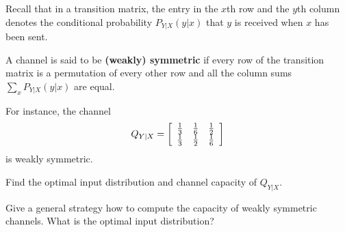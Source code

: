 \documentclass[a4paper,10pt,landscape,twocolumn]{scrartcl}
\begin{document}
%

\begin{exercise}
Recall that in a transition matrix, the entry in the $x$th row and the $y$th column denotes the conditional probability $P_{Y|X}(y|x)$ that $y$ is received when $x$ has been sent.


A channel is said to be \textbf{(weakly) symmetric} if every row of the transition matrix is a permutation of every other row and all the column sums $\sum_x P_{Y|X}(y|x)$ are equal.

For instance, %
the channel
\[
Q_{Y|X} = \left[
\begin{array}{c c c}
\frac{1}{3}&\frac{1}{6}&\frac{1}{2}\\
\frac{1}{3}&\frac{1}{2}&\frac{1}{6}
\end{array}
\right]
\]
is weakly symmetric.
	\begin{subex}
	Find the optimal input distribution and channel capacity of $Q_{Y|X}$.
	\end{subex}
	\begin{subex}
	Give a general strategy how to compute the capacity of weakly symmetric channels. What is the optimal input distribution?
	\end{subex}
\end{exercise}
\end{document}
